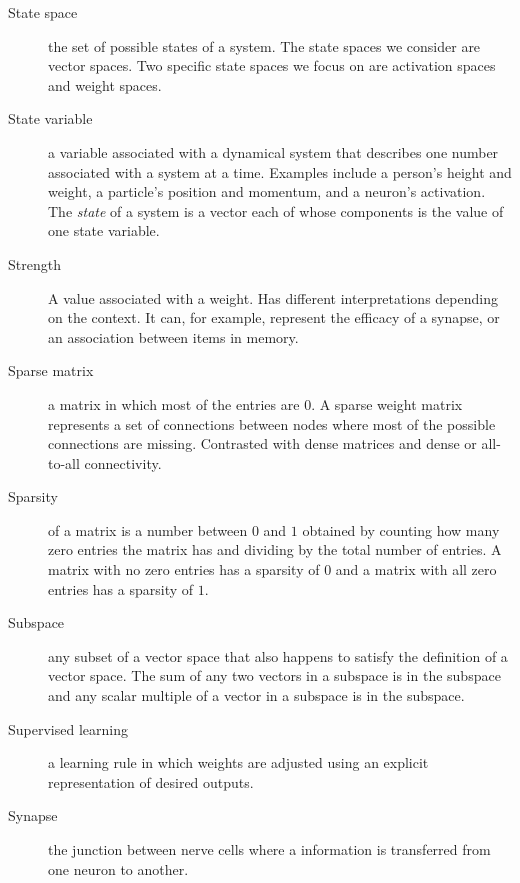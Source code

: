 \begin{description}
\item[State space] the set of possible states of a system. The state spaces we consider are vector spaces. Two specific state spaces we focus on are activation spaces and weight spaces.

\item[State variable] a variable associated with a dynamical system that describes one number associated with a system at a time. Examples include a person's height and weight, a particle's position and momentum, and a neuron's activation. The \emph{state} of a system is a vector each of whose components is the value of one state variable. 


\item[Strength] A value associated with a weight. Has different interpretations depending on the context. It can, for example, represent the efficacy of a synapse, or an association between items in memory.


\item[Sparse matrix] a matrix in which most of the entries are 0. A sparse weight matrix represents a set of connections between nodes where most of the possible connections are missing. Contrasted with dense matrices and dense or all-to-all connectivity. 

\item[Sparsity] of a matrix is a number between $0$ and $1$ obtained by counting how many zero entries the matrix has and dividing by the total number of entries. A matrix with no zero entries has a sparsity of $0$ and a matrix with all zero entries has a sparsity of $1$.

\item[Subspace] any subset of a vector space that also happens to satisfy the definition of a vector space. The sum of any two vectors in a subspace is in the subspace and any scalar multiple of a vector in a subspace is in the subspace.

\item[Supervised learning] a learning rule in which weights are adjusted using an explicit representation of desired outputs.


\item[Synapse] the junction between nerve cells where a information is transferred from one neuron to another.


\end{description}
